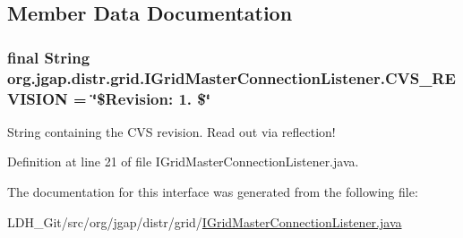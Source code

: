 \subsection{Member Data Documentation}
\hypertarget{interfaceorg_1_1jgap_1_1distr_1_1grid_1_1_i_grid_master_connection_listener_ace8d9d4f96c0c8ea04a9531227d0e170}{
\subsubsection[{C\-V\-S\-\_\-\-R\-E\-V\-I\-S\-I\-O\-N}]{\setlength{\rightskip}{0pt plus 5cm}final String org.\-jgap.\-distr.\-grid.\-I\-Grid\-Master\-Connection\-Listener.\-C\-V\-S\-\_\-\-R\-E\-V\-I\-S\-I\-O\-N = \char`\"{}\$Revision\-: 1. \$\char`\"{}\hspace{0.3cm}{\ttfamily [static]}}}\label{interfaceorg_1_1jgap_1_1distr_1_1grid_1_1_i_grid_master_connection_listener_ace8d9d4f96c0c8ea04a9531227d0e170}
String containing the C\-V\-S revision. Read out via reflection! 

Definition at line 21 of file I\-Grid\-Master\-Connection\-Listener.\-java.



The documentation for this interface was generated from the following file\-:\begin{DoxyCompactItemize}
\item 
L\-D\-H\-\_\-\-Git/src/org/jgap/distr/grid/\hyperlink{_i_grid_master_connection_listener_8java}{I\-Grid\-Master\-Connection\-Listener.\-java}\end{DoxyCompactItemize}
